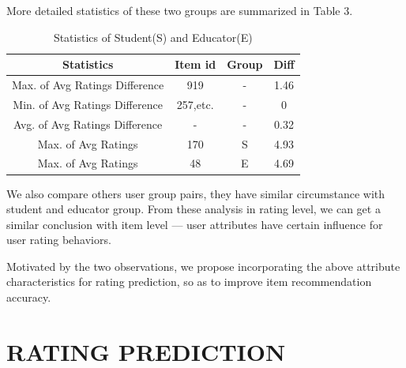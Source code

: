 \documentclass{llncs}
\begin{document}
	More detailed statistics of these two groups are summarized in Table 3.
	\begin{table}
		\centering
		\caption{Statistics of Student(S) and Educator(E)}
		\begin{tabular}{c|c|c|c} \hline
			Statistics & Item id & Group& Diff  \\ \hline \hline
			Max. of Avg Ratings Difference &919 &- &1.46 \\ \hline
			Min. of Avg Ratings Difference &257,etc. &- &0 \\ \hline
			Avg. of Avg Ratings Difference &- &- &0.32 \\ \hline
			Max. of Avg Ratings  &170 & S &4.93 \\ \hline
			Max. of Avg Ratings  &48 & E &4.69 \\ \hline
		\end{tabular}
	\end{table}
	
	We also compare others user group pairs, they have similar circumstance with student and educator group.
	From these analysis in rating level, we can get a similar conclusion with item level --- user attributes
	have certain influence for user rating behaviors.
	
	Motivated by the two observations, we propose incorporating the
	above attribute characteristics for rating prediction, so as to improve item recommendation accuracy.
	
\section{RATING PREDICTION}
\end{document}
